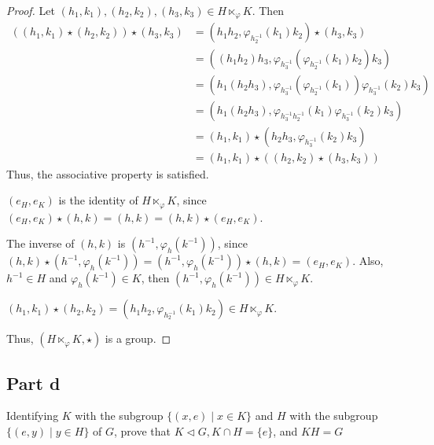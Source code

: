 \begin{answer}
    \begin{proof}
        Let $(h_1,k_1), (h_2,k_2),(h_3,k_3)\in H \ltimes_{\varphi} K$. Then
        \begin{equation}
            \begin{aligned}
                ((h_1,k_1)\star(h_2,k_2))\star(h_3,k_3) &= (h_1h_2,\varphi_{h_2^{-1}}(k_1)k_2)\star(h_3,k_3)\\
                &= ((h_1h_2)h_3,\varphi_{h_3^{-1}}(\varphi_{h_2^{-1}}(k_1)k_2)k_3)\\
                &= (h_1(h_2h_3),\varphi_{h_3^{-1}}(\varphi_{h_2^{-1}}(k_1))\varphi_{h_3^{-1}}(k_2)k_3)\\
                &= (h_1(h_2h_3),\varphi_{h_3^{-1}h_2^{-1}}(k_1)\varphi_{h_3^{-1}}(k_2)k_3)\\
                &= (h_1,k_1)\star(h_2h_3,\varphi_{h_3^{-1}}(k_2)k_3)\\
                &= (h_1,k_1)\star((h_2,k_2)\star(h_3,k_3))
            \end{aligned}
        \end{equation}
        Thus, the associative property is satisfied.
        
        $(e_H,e_K)$ is the identity of $H \ltimes_{\varphi} K$, since $(e_H,e_K) \star (h,k) = (h,k) = (h,k) \star (e_H,e_K)$.
        
        The inverse of $(h,k)$ is $(h^{-1},\varphi_h(k^{-1}))$, since $(h,k)\star(h^{-1},\varphi_h(k^{-1})) = (h^{-1},\varphi_h(k^{-1}))\star(h,k) = (e_H,e_K)$. Also, $h^{-1} \in H$ and $\varphi_h(k^{-1}) \in K$, then $(h^{-1},\varphi_h(k^{-1})) \in H \ltimes_{\varphi} K$.
        
        $(h_1,k_1)\star(h_2,k_2) = (h_1h_2, \varphi_{h_2^{-1}}(k_1)k_2) \in H \ltimes_{\varphi} K$.
        
        Thus, $(H \ltimes_{\varphi} K,\star)$ is a group.
    \end{proof}
\end{answer}

\subsection{Part d}

\begin{question}
    Identifying $K$ with the subgroup $\{(x, e) \mid x \in K\}$ and $H$ with the subgroup $\{(e, y) \mid y \in H\}$ of $G$, prove that $K \triangleleft G, K \cap H=\{e\}$, and $K H=G$
\end{question}

\begin{answer}
    
\end{answer}